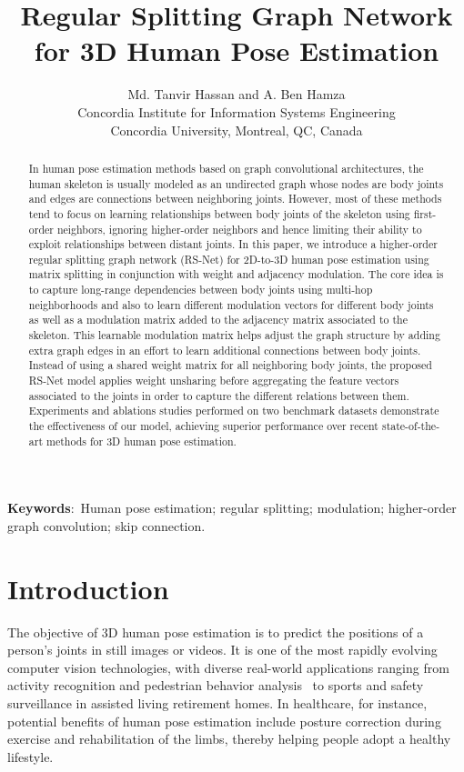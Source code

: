 \documentclass[10pt,journal]{IEEEtran}
\title{\LARGE\textbf{Regular Splitting Graph Network for 3D Human Pose Estimation}}
\author{Md. Tanvir Hassan and A. Ben Hamza\\
Concordia Institute for Information Systems Engineering\\
Concordia University, Montreal, QC, Canada
}
\date{}
\begin{document}
\maketitle

\begin{abstract}
In human pose estimation methods based on graph convolutional architectures, the human skeleton is usually modeled as an undirected graph whose nodes are body joints and edges are connections between neighboring joints. However, most of these methods tend to focus on learning relationships between body joints of the skeleton using first-order neighbors, ignoring higher-order neighbors and hence limiting their ability to exploit relationships between distant joints. In this paper, we introduce a higher-order regular splitting graph network (RS-Net) for 2D-to-3D human pose estimation using matrix splitting in conjunction with weight and adjacency modulation. The core idea is to capture long-range dependencies between body joints using multi-hop neighborhoods and also to learn different modulation vectors for different body joints as well as a modulation matrix added to the adjacency matrix associated to the skeleton. This learnable modulation matrix helps adjust the graph structure by adding extra graph edges in an effort to learn additional connections between body joints. Instead of using a shared weight matrix for all neighboring body joints, the proposed RS-Net model applies weight unsharing before aggregating the feature vectors associated to the joints in order to capture the different relations between them. Experiments and ablations studies performed on two benchmark datasets demonstrate the effectiveness of our model, achieving superior performance over recent state-of-the-art methods for 3D human pose estimation.
\end{abstract}

\bigskip
\noindent\textbf{Keywords}:\, Human pose estimation; regular splitting; modulation; higher-order graph convolution; skip connection.

\section{Introduction}
The objective of 3D human pose estimation is to predict the positions of a person's joints in still images or videos. It is one of the most rapidly evolving computer vision technologies, with diverse real-world applications ranging from activity recognition and pedestrian behavior analysis~\cite{YZhao:20} to sports and safety surveillance in assisted living retirement homes. In healthcare, for instance, potential benefits of human pose estimation include posture correction during exercise and rehabilitation of the limbs, thereby helping people adopt a healthy lifestyle.
	
\end{document}
